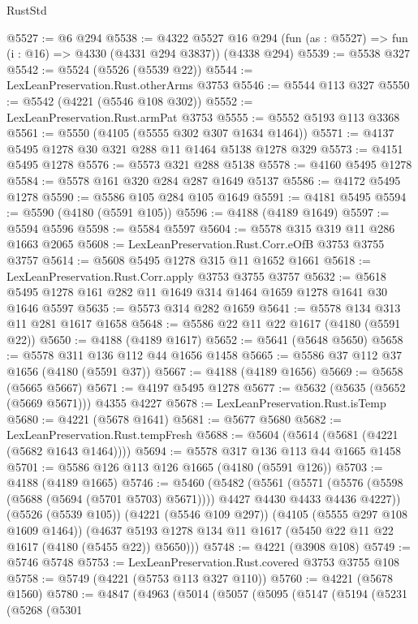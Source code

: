 \begin{lexlean}{RustStd}
\begin{coremodule}
@5527 := @6 @294
@5538 := @4322
    @5527
    @16
    @294
    (fun (as : @5527) => fun (i : @16) => @4330 (@4331 @294 @3837))
    (@4338 @294)
@5539 := @5538 @327
@5542 := @5524 (@5526 (@5539 @22))
@5544 := LexLeanPreservation.Rust.otherArms @3753
@5546 := @5544 @113 @327
@5550 := @5542 (@4221 (@5546 @108 @302))
@5552 := LexLeanPreservation.Rust.armPat @3753
@5555 := @5552 @5193 @113 @3368
@5561 := @5550 (@4105 (@5555 @302 @307 @1634 @1464))
@5571 := @4137 @5495 @1278 @30 @321 @288 @11 @1464 @5138 @1278 @329
@5573 := @4151 @5495 @1278
@5576 := @5573 @321 @288 @5138
@5578 := @4160 @5495 @1278
@5584 := @5578 @161 @320 @284 @287 @1649 @5137
@5586 := @4172 @5495 @1278
@5590 := @5586 @105 @284 @105 @1649
@5591 := @4181 @5495
@5594 := @5590 (@4180 (@5591 @105))
@5596 := @4188 (@4189 @1649)
@5597 := @5594 @5596
@5598 := @5584 @5597
@5604 := @5578 @315 @319 @11 @286 @1663 @2065
@5608 := LexLeanPreservation.Rust.Corr.eOfB @3753 @3755 @3757
@5614 := @5608 @5495 @1278 @315 @11 @1652 @1661
@5618 := LexLeanPreservation.Rust.Corr.apply @3753 @3755 @3757
@5632 := @5618 @5495 @1278 @161 @282 @11 @1649 @314 @1464 @1659 @1278 @1641 @30 @1646 @5597
@5635 := @5573 @314 @282 @1659
@5641 := @5578 @134 @313 @11 @281 @1617 @1658
@5648 := @5586 @22 @11 @22 @1617 (@4180 (@5591 @22))
@5650 := @4188 (@4189 @1617)
@5652 := @5641 (@5648 @5650)
@5658 := @5578 @311 @136 @112 @44 @1656 @1458
@5665 := @5586 @37 @112 @37 @1656 (@4180 (@5591 @37))
@5667 := @4188 (@4189 @1656)
@5669 := @5658 (@5665 @5667)
@5671 := @4197 @5495 @1278
@5677 := @5632 (@5635 (@5652 (@5669 @5671))) @4355 @4227
@5678 := LexLeanPreservation.Rust.isTemp
@5680 := @4221 (@5678 @1641)
@5681 := @5677 @5680
@5682 := LexLeanPreservation.Rust.tempFresh
@5688 := @5604 (@5614 (@5681 (@4221 (@5682 @1643 @1464))))
@5694 := @5578 @317 @136 @113 @44 @1665 @1458
@5701 := @5586 @126 @113 @126 @1665 (@4180 (@5591 @126))
@5703 := @4188 (@4189 @1665)
@5746 := @5460
    (@5482
      (@5561
        (@5571 (@5576 (@5598 (@5688 (@5694 (@5701 @5703) @5671)))) @4427 @4430 @4433 @4436 @4227))
      (@5526 (@5539 @105))
      (@4221 (@5546 @109 @297))
      (@4105 (@5555 @297 @108 @1609 @1464))
      (@4637 @5193 @1278 @134 @11 @1617 (@5450 @22 @11 @22 @1617 (@4180 (@5455 @22)) @5650)))
@5748 := @4221 (@3908 @108)
@5749 := @5746 @5748
@5753 := LexLeanPreservation.Rust.covered @3753 @3755 @108
@5758 := @5749 (@4221 (@5753 @113 @327 @110))
@5760 := @4221 (@5678 @1560)
@5780 := @4847
    (@4963
      (@5014
        (@5057
          (@5095
            (@5147
              (@5194
                (@5231
                  (@5268
                    (@5301

\end{coremodule}
\end{lexlean}
